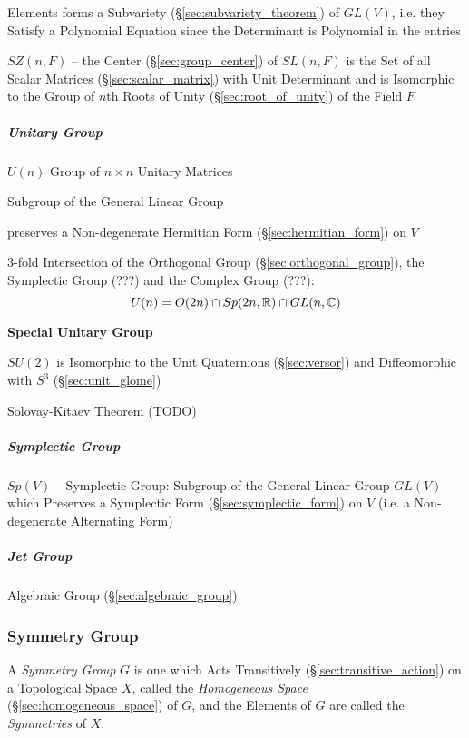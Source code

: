 Elements forms a Subvariety (\S\ref{sec:subvariety_theorem}) of $GL(V)$, i.e.
they Satisfy a Polynomial Equation since the Determinant is Polynomial in the
entries

$SZ(n,F)$ -- the Center (\S\ref{sec:group_center}) of $SL(n,F)$ is the Set of
all Scalar Matrices (\S\ref{sec:scalar_matrix}) with Unit Determinant and is
Isomorphic to the Group of $n$th Roots of Unity (\S\ref{sec:root_of_unity})
of the Field $F$



\subparagraph{Unitary Group}\label{sec:unitary_group}\hfill

$U(n)$ Group of $n \times n$ Unitary Matrices

Subgroup of the General Linear Group

preserves a Non-degenerate Hermitian Form (\S\ref{sec:hermitian_form}) on $V$

3-fold Intersection of the Orthogonal Group (\S\ref{sec:orthogonal_group}), the
Symplectic Group (???) and the Complex Group (???): %
\[
  U(n) = O(2n) \cap Sp(2n,\mathbb{R}) \cap GL(n,\mathbb{C})
\]



\textbf{Special Unitary Group}

$SU(2)$ is Isomorphic to the Unit Quaternions (\S\ref{sec:versor}) and
Diffeomorphic with $S^3$ (\S\ref{sec:unit_glome})

Solovay-Kitaev Theorem (TODO)



\subparagraph{Symplectic Group}\label{sec:symplectic_group}\hfill

$Sp(V)$ -- Symplectic Group: Subgroup of the General Linear Group $GL(V)$ which
Preserves a Symplectic Form (\S\ref{sec:symplectic_form}) on $V$ (i.e. a
Non-degenerate Alternating Form)



\subparagraph{Jet Group}\label{sec:jet_group}\hfill

Algebraic Group (\S\ref{sec:algebraic_group})



\subsubsection{Symmetry Group}\label{sec:symmetry_group}

A \emph{Symmetry Group} $G$ is one which Acts Transitively
(\S\ref{sec:transitive_action}) on a Topological Space $X$, called the
\emph{Homogeneous Space} (\S\ref{sec:homogeneous_space}) of $G$, and the
Elements of $G$ are called the \emph{Symmetries} of $X$.

